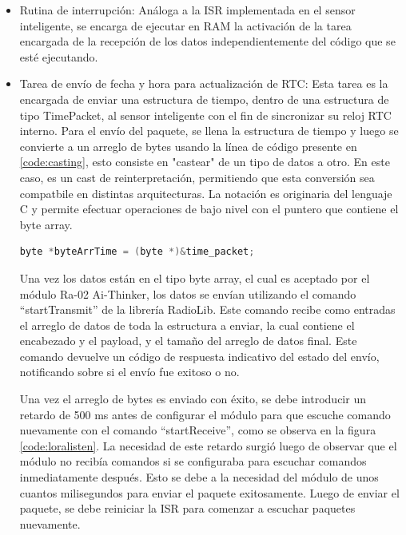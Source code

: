 \begin{itemize}
    
    \item Rutina de interrupción: Análoga a la ISR implementada en el sensor inteligente, se encarga de ejecutar en RAM la activación de la tarea encargada de la recepción de los datos independientemente del código que se esté ejecutando.
    
    \item Tarea de envío de fecha y hora para actualización de RTC: Esta tarea es la encargada de enviar una estructura de tiempo, dentro de una estructura de tipo TimePacket, al sensor inteligente con el fin de sincronizar su reloj RTC interno. Para el envío del paquete, se llena la estructura de tiempo y luego se convierte a un arreglo de bytes usando la línea de código presente en \ref{code:casting}, esto consiste en "castear" de un tipo de datos a otro. En este caso, es un cast de reinterpretación, permitiendo que esta conversión sea compatbile en distintas arquitecturas. La notación es originaria del lenguaje C y permite efectuar operaciones de bajo nivel con el puntero que contiene el byte array.
    
    \begin{lstlisting}[language=C++, caption=Conversión de datos a tipo byte array usando casting, label=code:casting]
        byte *byteArrTime = (byte *)&time_packet;
    \end{lstlisting}

    Una vez los datos están en el tipo byte array, el cual es aceptado por el módulo Ra-02 Ai-Thinker, los datos se envían utilizando el comando ``startTransmit'' de la librería RadioLib. Este comando recibe como entradas el arreglo de datos de toda la estructura a enviar, la cual contiene el encabezado y el payload, y el tamaño del arreglo de datos final. Este comando devuelve un código de respuesta indicativo del estado del envío, notificando sobre si el envío fue exitoso o no.

    Una vez el arreglo de bytes es enviado con éxito, se debe introducir un retardo de 500 ms antes de configurar el módulo para que escuche comando nuevamente con el comando ``startReceive'', como se observa en la figura \ref{code:loralisten}. La necesidad de este retardo surgió luego de observar que el módulo no recibía comandos si se configuraba para escuchar comandos inmediatamente después. Esto se debe a la necesidad del módulo de unos cuantos milisegundos para enviar el paquete exitosamente. Luego de enviar el paquete, se debe reiniciar la ISR para comenzar a escuchar paquetes nuevamente.


\end{itemize}
